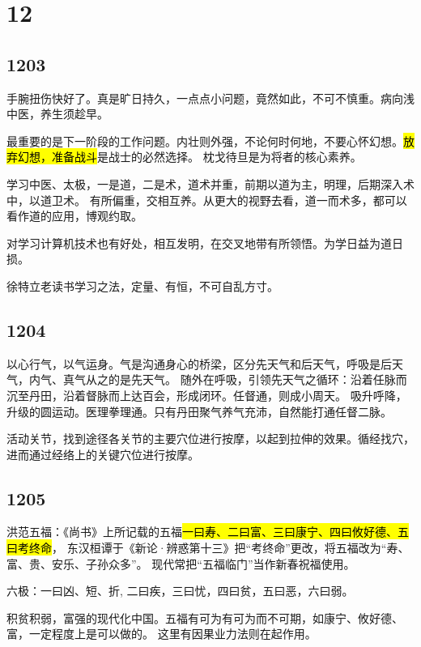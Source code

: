 \section{12}

\subsection{1203}

手腕扭伤快好了。真是旷日持久，一点点小问题，竟然如此，不可不慎重。病向浅中医，养生须趁早。

最重要的是下一阶段的工作问题。内壮则外强，不论何时何地，不要心怀幻想。\hl{放弃幻想，准备战斗}是战士的必然选择。
枕戈待旦是为将者的核心素养。

学习中医、太极，一是道，二是术，道术并重，前期以道为主，明理，后期深入术中，以道卫术。
有所偏重，交相互养。从更大的视野去看，道一而术多，都可以看作道的应用，博观约取。

对学习计算机技术也有好处，相互发明，在交叉地带有所领悟。为学日益为道日损。

徐特立老读书学习之法，定量、有恒，不可自乱方寸。

\subsection{1204}

以心行气，以气运身。气是沟通身心的桥梁，区分先天气和后天气，呼吸是后天气，内气、真气从之的是先天气。
随外在呼吸，引领先天气之循环：沿着任脉而沉至丹田，沿着督脉而上达百会，形成闭环。任督通，则成小周天。
吸升呼降，升级的圆运动。医理拳理通。只有丹田聚气养气充沛，自然能打通任督二脉。

活动关节，找到途径各关节的主要穴位进行按摩，以起到拉伸的效果。循经找穴，进而通过经络上的关键穴位进行按摩。

\subsection{1205}

洪范五福：《尚书》上所记载的五福\hl{一曰寿、二曰富、三曰康宁、四曰攸好德、五曰考终命}，
东汉桓谭于《新论·辨惑第十三》把“考终命”更改，将五福改为“寿、富、贵、安乐、子孙众多”。
现代常把“五福临门”当作新春祝福使用。

六极：一曰凶、短、折, 二曰疾，三曰忧，四曰贫，五曰恶，六曰弱。

积贫积弱，富强的现代化中国。五福有可为有可为而不可期，如康宁、攸好德、富，一定程度上是可以做的。
这里有因果业力法则在起作用。

